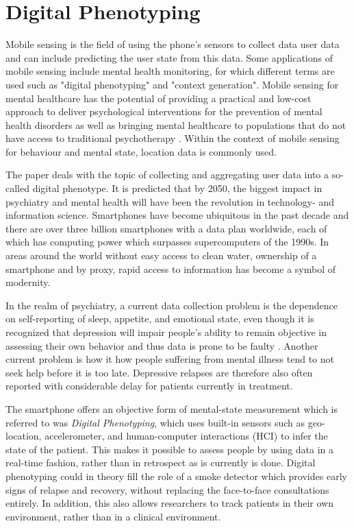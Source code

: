 \section{Digital Phenotyping}

Mobile sensing is the field of using the phone's sensors to collect data user data and can include predicting the user state from this data. Some applications of mobile sensing include mental health monitoring, for which different terms are used such as "digital phenotyping" and "context generation". Mobile sensing for mental healthcare has the potential of providing a practical and low-cost approach to deliver psychological interventions for the prevention of mental health disorders \cite{mobile-based-interventions} as well as bringing mental healthcare to populations that do not have access to traditional psychotherapy \cite{future-mental-health}. Within the context of mobile sensing for behaviour and mental state, location data is commonly used. 

The paper \cite{digital_phenotyping} deals with the topic of collecting and aggregating user data into a so-called digital phenotype. It is predicted that by 2050, the biggest impact in psychiatry and mental health will have been the revolution in technology- and information science. Smartphones have become ubiquitous in the past decade and there are over three billion smartphones with a data plan worldwide, each of which has computing power which surpasses supercomputers of the 1990s. In areas around the world without easy access to clean water, ownership of a smartphone and by proxy, rapid access to information has become a symbol of modernity. 

In the realm of psychiatry, a current data collection problem is the dependence on self-reporting of sleep, appetite, and emotional state, even though it is recognized that depression will impair people's ability to remain objective in assessing their own behavior and thus data is prone to be faulty \cite{digital_phenotyping}. Another current problem is how it how people suffering from mental illness tend to not seek help before it is too late. Depressive relapses are therefore also often reported with considerable delay for patients currently in treatment. 

The smartphone offers an objective form of mental-state measurement which is referred to was \textit{Digital Phenotyping}, which uses built-in sensors such as geo-location, accelerometer, and human-computer interactions (HCI) to infer the state of the patient. This makes it possible to assess people by using data in a real-time fashion, rather than in retrospect as is currently is done. Digital phenotyping could in theory fill the role of a smoke detector which provides early signs of relapse and recovery, without replacing the face-to-face consultations entirely. In addition, this also allows researchers to track patients in their own environment, rather than in a clinical environment.
